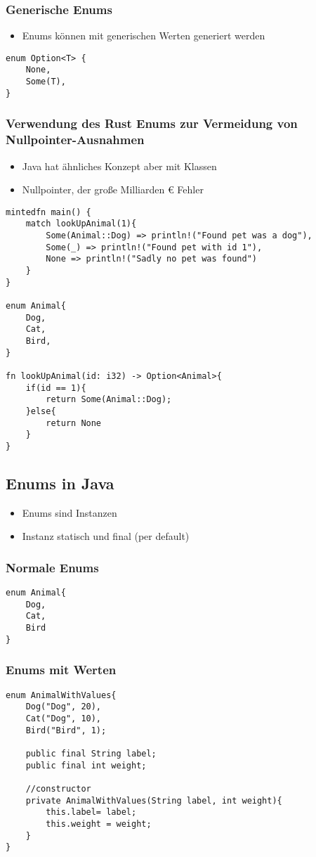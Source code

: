 \documentclass[a4paper, 1ppt]{article}
\begin{document}
\subsubsection{Generische Enums}
\begin{itemize}
	\item Enums können mit generischen Werten generiert werden
\end{itemize}
\begin{verbatim}
enum Option<T> {
	None,
	Some(T),
}
\end{verbatim}
\subsubsection{Verwendung des Rust Enums zur Vermeidung von Nullpointer-Ausnahmen}
\begin{itemize}
	\item Java hat ähnliches Konzept aber mit Klassen
	\item Nullpointer, der große Milliarden € Fehler
\end{itemize}
\begin{verbatim}
mintedfn main() {
    match lookUpAnimal(1){
        Some(Animal::Dog) => println!("Found pet was a dog"),
        Some(_) => println!("Found pet with id 1"),
        None => println!("Sadly no pet was found")
    }
}

enum Animal{
    Dog,
    Cat,
    Bird,
}

fn lookUpAnimal(id: i32) -> Option<Animal>{
    if(id == 1){
        return Some(Animal::Dog);
    }else{
        return None
    }
}
\end{verbatim}
\subsection{Enums in Java}
\begin{itemize}
	\item Enums sind Instanzen
	\item Instanz statisch und final (per default)
\end{itemize}
\subsubsection{Normale Enums}
\begin{verbatim}
enum Animal{
    Dog,
    Cat,
    Bird
}
\end{verbatim}
\subsubsection{Enums mit Werten}
\begin{verbatim}
enum AnimalWithValues{
    Dog("Dog", 20),
    Cat("Dog", 10),
    Bird("Bird", 1);

    public final String label;
    public final int weight;

    //constructor
    private AnimalWithValues(String label, int weight){
        this.label= label;
        this.weight = weight;
    }
}
\end{verbatim}
\end{document}
